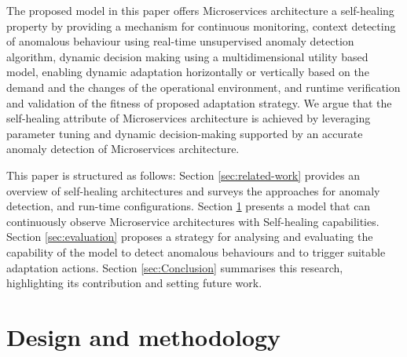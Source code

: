 \documentclass[graybox]{svmult}
\begin{document}

The proposed model in this paper offers Microservices architecture a self-healing property by providing a mechanism for continuous monitoring, context detecting of anomalous behaviour using real-time unsupervised anomaly detection algorithm, dynamic decision making using a multidimensional utility based model, enabling dynamic adaptation horizontally or vertically based on the demand and the changes of the operational environment, and runtime verification and validation of the fitness of proposed adaptation strategy. We argue that the self-healing attribute of Microservices architecture is achieved by leveraging parameter tuning and dynamic decision-making supported by an accurate anomaly detection of Microservices architecture. 

This paper is structured as follows: Section \ref{sec:related-work} provides an overview of self-healing architectures and surveys the approaches for  anomaly detection, and run-time configurations. Section \ref{sec:modelling} presents a model that can continuously observe Microservice architectures with Self-healing capabilities. Section \ref{sec:evaluation} proposes a strategy for analysing and evaluating the capability of the model  to detect anomalous behaviours and to trigger suitable adaptation actions. Section \ref{sec:Conclusion} summarises this research, highlighting its contribution and setting future work.



\section{Design and methodology}
\label{sec:modelling}
\end{document}
